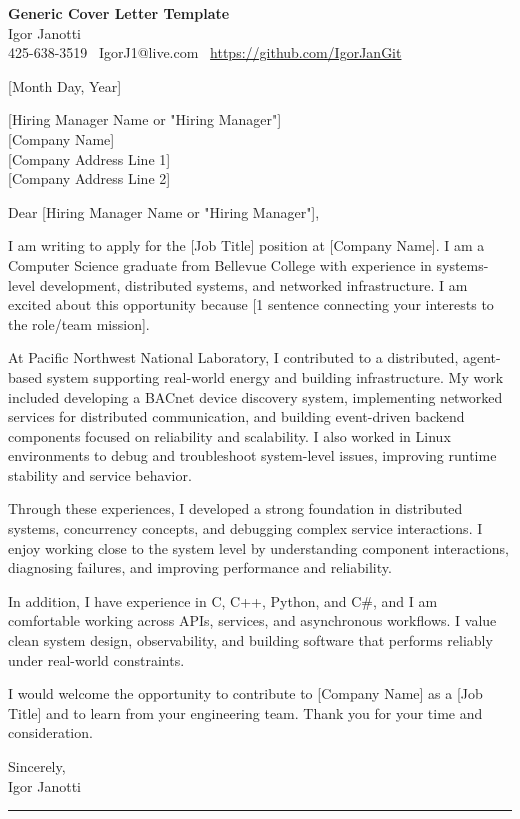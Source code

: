 \documentclass[11pt]{article}
\begin{document}
{\Large \textbf{Generic Cover Letter Template}}\\

Igor Janotti\\
425-638-3519 \textbar\ IgorJ1@live.com \textbar\ \url{https://github.com/IgorJanGit}

[Month Day, Year]

{[Hiring Manager Name or "Hiring Manager"]}\\
{[Company Name]}\\
{[Company Address Line 1]}\\
{[Company Address Line 2]}

Dear [Hiring Manager Name or "Hiring Manager"],

I am writing to apply for the [Job Title] position at [Company Name]. I am a Computer Science graduate from Bellevue College with experience in systems-level development, distributed systems, and networked infrastructure. I am excited about this opportunity because [1 sentence connecting your interests to the role/team mission].

At Pacific Northwest National Laboratory, I contributed to a distributed, agent-based system supporting real-world energy and building infrastructure. My work included developing a BACnet device discovery system, implementing networked services for distributed communication, and building event-driven backend components focused on reliability and scalability. I also worked in Linux environments to debug and troubleshoot system-level issues, improving runtime stability and service behavior.

Through these experiences, I developed a strong foundation in distributed systems, concurrency concepts, and debugging complex service interactions. I enjoy working close to the system level by understanding component interactions, diagnosing failures, and improving performance and reliability.

In addition, I have experience in C, C++, Python, and C\#, and I am comfortable working across APIs, services, and asynchronous workflows. I value clean system design, observability, and building software that performs reliably under real-world constraints.

I would welcome the opportunity to contribute to [Company Name] as a [Job Title] and to learn from your engineering team. Thank you for your time and consideration.

Sincerely,\\
Igor Janotti

\vspace{1em}
\hrule
\vspace{1em}
\end{document}
